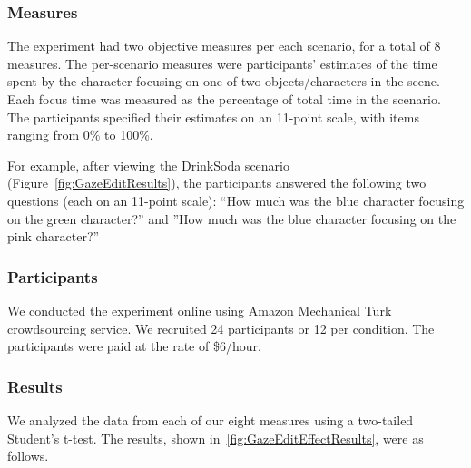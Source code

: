 \subsubsection{Measures}

The experiment had two objective measures per each scenario, for a total of 8 measures. The per-scenario measures were participants' estimates of the time spent by the character focusing on one of two objects/characters in the scene. Each focus time was measured as the percentage of total time in the scenario. The participants specified their estimates on an 11-point scale, with items ranging from 0\% to 100\%.

For example, after viewing the DrinkSoda scenario (Figure~\ref{fig:GazeEditResults}), the participants answered the following two questions (each on an 11-point scale): ``How much was the blue character focusing on the green character?'' and ''How much was the blue character focusing on the pink character?''

\subsubsection{Participants}

We conducted the experiment online using Amazon Mechanical Turk crowdsourcing service. We recruited 24 participants or 12 per condition. The participants were paid at the rate of \$6/hour.

\subsubsection{Results}

We analyzed the data from each of our eight measures using a two-tailed Student's t-test. The results, shown in~\ref{fig:GazeEditEffectResults}, were as follows.

